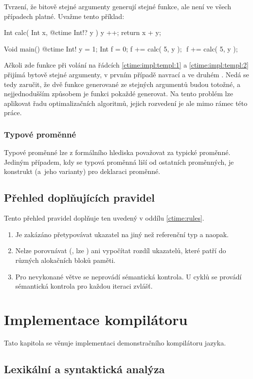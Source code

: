 Tvrzení, že bitově stejné \ctime argumenty generují stejné funkce, ale není ve všech případech platné. Uvažme tento příklad:
\begin{code}
Int calc( Int x, @ctime Int!? y ) {
	y ++;
	return x + y;
}

Void main() {
	@ctime Int! y = 1;
	Int f = 0;
	f += calc( 5, y ); $\label{ctime:impl:templ:1}$
	f += calc( 5, y ); $\label{ctime:impl:templ:2}$
}
\end{code}

Ačkoli zde funkce  při volání na řádcích \ref{ctime:impl:templ:1} a \ref{ctime:impl:templ:2} přijímá bytově stejné \ctime argumenty, v prvním případě navrací  a ve druhém . Nedá se tedy zaručit, že dvě funkce generované ze stejných \ctime argumentů budou totožné, a nejjednodušším způsobem je funkci pokaždé generovat. Na tento problém lze aplikovat řadu optimalizačních algoritmů, jejich rozvedení je ale mimo rámec této práce.

\subsection{Typové proměnné}
Typové proměnné lze z formálního hlediska považovat za typické \ctime proměnné. Jediným případem, kdy se typová proměnná liší od ostatních \ctime proměnných, je konstrukt  (a~jeho varianty) pro deklaraci proměnné.


\section{Přehled doplňujících pravidel} \label{ctime:moreRules}
Tento přehled pravidel doplňuje ten uvedený v oddílu \ref{ctime:rules}.

\begin{enumerate}
	\item Je zakázáno přetypovávat \ctime ukazatel na jiný než referenční \ctime typ a naopak.
	\item Nelze porovnávat (\inlineCode{< > <= >=}, lze ) ani vypočítat rozdíl \ctime ukazatelů, které patří do různých alokačních bloků paměti.
	\item Pro nevykonané \ctime větve se neprovádí sémantická kontrola. U \ctime cyklů se provádí sémantická kontrola pro každou iteraci zvlášť.
\end{enumerate}

\chapter{Implementace kompilátoru}
Tato kapitola se věnuje implementaci demonstračního kompilátoru jazyka.

\section{Lexikální a syntaktická analýza}
